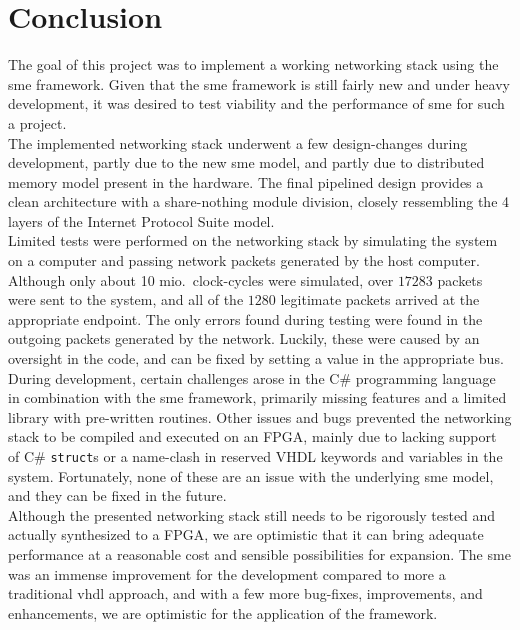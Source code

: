 \chapter{Conclusion}
\label{chap:conclusion}

The goal of this project was to implement a working networking stack using the
\gls{sme} framework. Given that the \gls{sme} framework is still fairly new and
under heavy development, it was desired to test viability and the performance
of \gls{sme} for such a project.\\

The implemented networking stack underwent a few design-changes during
development, partly due to the new \gls{sme} model, and partly due to
distributed memory model present in the hardware. The final pipelined design
provides a clean architecture with a share-nothing module division, closely
ressembling the 4 layers of the Internet Protocol Suite model.\\

Limited tests were performed on the networking stack by simulating the system
on a computer and passing network packets generated by the host computer.
Although only about 10 mio.\ clock-cycles were simulated, over $17283$ packets
were sent to the system, and all of the $1280$ legitimate packets arrived at the
appropriate endpoint. The only errors found during testing were found in the
outgoing packets generated by the network. Luckily, these were caused by an
oversight in the code, and can be fixed by setting a value in the appropriate
bus.\\

During development, certain challenges arose in the C\# programming language in
combination with the \gls{sme} framework, primarily missing features and a limited
library with pre-written routines. Other issues and bugs prevented the
networking stack to be compiled and executed on an FPGA, mainly due to lacking
support of C\# \texttt{struct}s or a name-clash in reserved VHDL keywords and
variables in the system. Fortunately, none of these are an issue with the underlying
\gls{sme} model, and they can be fixed in the future.\\

Although the presented networking stack still needs to be rigorously tested and
actually synthesized to a FPGA, we are optimistic that it can bring adequate
performance at a reasonable cost and sensible possibilities for expansion. The
\gls{sme} was an immense improvement for the development compared to more a
traditional \gls{vhdl} approach, and with a few more bug-fixes, improvements,
and enhancements, we are optimistic for the application of the framework.




%


